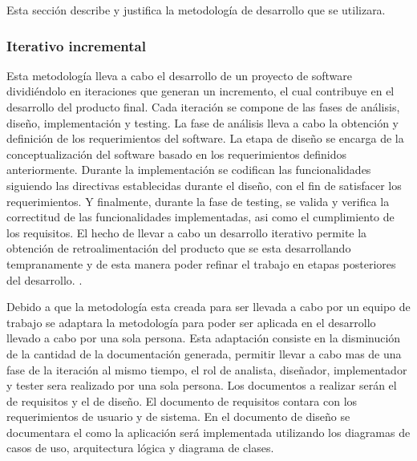 \documentclass[11pt,letterpaper]{article}
\begin{document}
Esta sección describe y justifica la metodología de desarrollo que se utilizara.
\subsubsection{Iterativo incremental}

Esta metodología lleva a cabo el desarrollo de un proyecto de software dividiéndolo en iteraciones que generan un incremento, el cual contribuye en el desarrollo del producto final. Cada iteración se compone de las fases de análisis, diseño, implementación y testing. La fase de análisis lleva a cabo la obtención y definición de los requerimientos del software. La etapa de diseño se encarga de la conceptualización del software basado en los requerimientos definidos anteriormente. Durante la implementación se codifican las funcionalidades siguiendo las directivas establecidas durante el diseño, con el fin de satisfacer los requerimientos. Y finalmente, durante la fase de testing, se valida y verifica la correctitud de las funcionalidades implementadas, asi como el cumplimiento de los requisitos. El hecho de llevar a cabo un desarrollo iterativo permite la obtención de retroalimentación del producto que se esta desarrollando tempranamente y de esta manera poder refinar el trabajo en etapas posteriores del desarrollo. \cite{Victor2003, Mitchell2009, Martin1999,Alshamrani2015}.

Debido a que la metodología esta creada para ser llevada a cabo por un equipo de trabajo se adaptara la metodología para poder ser aplicada en el desarrollo llevado a cabo por una sola persona. Esta adaptación consiste en la disminución de la cantidad de la documentación generada, permitir llevar a cabo mas de una fase de la iteración al mismo tiempo, el rol de analista, diseñador, implementador y tester sera realizado por una sola persona. Los documentos a realizar serán el de requisitos y el de diseño. El documento de requisitos contara con los requerimientos de usuario y de sistema. En el documento de diseño se documentara el como la aplicación será implementada utilizando los diagramas de casos de uso, arquitectura lógica y diagrama de clases.
\end{document}

